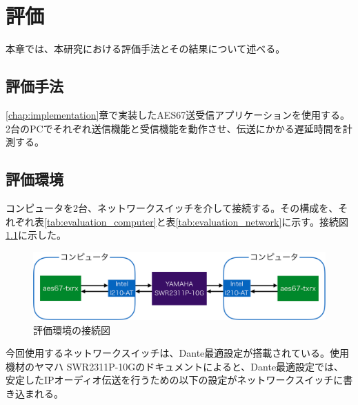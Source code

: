 \chapter{評価}
\label{chap:evaluation}

本章では、本研究における評価手法とその結果について述べる。

\section{評価手法}

\ref{chap:implementation}章で実装したAES67送受信アプリケーションを使用する。2台のPCでそれぞれ送信機能と受信機能を動作させ、伝送にかかる遅延時間を計測する。

\section{評価環境}

コンピュータを2台、ネットワークスイッチを介して接続する。その構成を、それぞれ表\ref{tab:evaluation_computer}と表\ref{tab:evaluation_network}に示す。接続図\ref{fig:evaluation_environment}に示した。

\begin{figure}[tbp]
  \centering
  \includegraphics[width=\linewidth]{img/evaluation_environment.pdf}
  \caption{評価環境の接続図}
  \label{fig:evaluation_environment}
\end{figure}

今回使用するネットワークスイッチは、Dante最適設定が搭載されている。使用機材のヤマハ SWR2311P-10Gのドキュメント\cite{yamaha-swr2311p-dante}によると、Dante最適設定では、安定したIPオーディオ伝送を行うための以下の設定がネットワークスイッチに書き込まれる。

